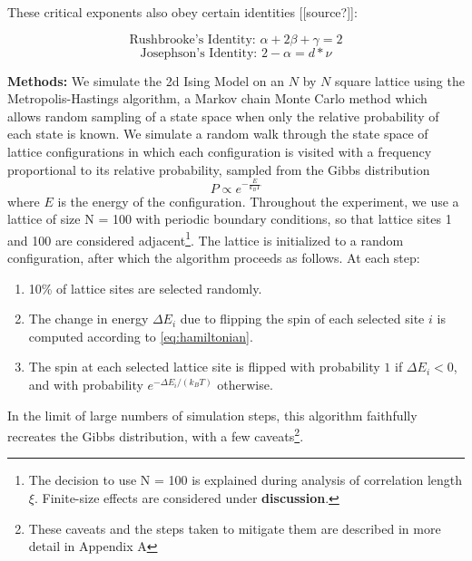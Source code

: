 \documentclass[letter,scriptaddress,twocolumn, prl,nofootinbib]{revtex4}
\begin{document}
These critical exponents also obey certain identities [[source?]]:

\begin{equation}
	\text{Rushbrooke's Identity: } \alpha + 2\beta + \gamma = 2 \label{eq:rushbrooke}
\end{equation}
\begin{equation}
	\text{Josephson's Identity: } 2 - \alpha = d * \nu \label{eq:josephson}
\end{equation}

\textbf{Methods:} We simulate the 2d Ising Model on an $N$ by $N$ square lattice using the Metropolis-Hastings algorithm, a Markov chain Monte Carlo method which allows random sampling of a state space when only the relative probability of each state is known. We simulate a random walk through the state space of lattice configurations in which each configuration is visited with a frequency proportional to its relative probability, sampled from the Gibbs distribution
\begin{equation}
	P \propto e^{-\frac{E}{k_B T}}
\end{equation}
where $E$ is the energy of the configuration. Throughout the experiment, we use a lattice of size N = 100 with periodic boundary conditions, so that lattice sites 1 and 100 are considered adjacent\footnote{The decision to use N = 100 is explained during analysis of correlation length $\xi$. Finite-size effects are considered under \textbf{discussion}.}. The lattice is initialized to a random configuration, after which the algorithm proceeds as follows. At each step:
\begin{enumerate}
	\item 10\% of lattice sites are selected randomly.
	\item The change in energy $\Delta E_i$ due to flipping the spin of each selected site $i$ is computed according to \autoref{eq:hamiltonian}.
	\item The spin at each selected lattice site is flipped with probability $1$ if $\Delta E_i < 0$, and with probability $e^{-\Delta E_i/(k_BT)}$ otherwise.
\end{enumerate}

In the limit of large numbers of simulation steps, this algorithm faithfully recreates the Gibbs distribution, with a few caveats\footnote{These caveats and the steps taken to mitigate them are described in more detail in Appendix A}.
\end{document}

